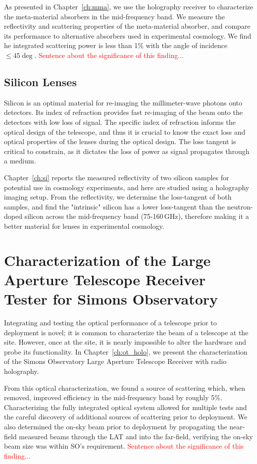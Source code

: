 As presented in Chapter~\ref{ch:mma}, we use the holography receiver to characterize the meta-material absorbers in the mid-frequency band.  We measure the reflectivity and scattering properties of the meta-material absorber, and compare its performance to alternative absorbers used in experimental cosmology.  We find he integrated scattering power is less than 1\% with the angle of incidence  $\leq45\deg$.  \textcolor{red}{Sentence about the significance of this finding...}


\subsection{Silicon Lenses}
Silicon is an optimal material for re-imaging the millimeter-wave photons onto detectors.  Its index of refraction provides fast re-imaging of the beam onto the detectors with low loss of signal.  The specific index of refraction informs the optical design of the telescope, and thus it is crucial to know the exact loss and optical properties of the lenses during the optical design.  The loss tangent is critical to constrain, as it dictates the loss of power as signal propagates through a medium.

Chapter~\ref{ch:si} reports the measured reflectivity of two silicon samples for potential use in cosmology experiments, and here are studied using a holography imaging setup.  From the reflectivity, we determine the loss-tangent of both samples, and find the "intrinsic" silicon has a lower loss-tangent than the neutron-doped silicon across the mid-frequency band (75-160\,GHz), therefore making it a better material for lenses in experimental cosmology.

\section{Characterization of the Large Aperture Telescope Receiver Tester for Simons Observatory}
Integrating and testing the optical performance of a telescope prior to deployment is novel; it is common to characterize the beam of a telescope at the site.  However, once at the site, it is nearly impossible to alter the hardware and probe its functionality.  In Chapter~\ref{ch:ot_holo}, we present the characterization of the Simons Observatory Large Aperture Telescope Receiver with radio holography.

From this optical characterization, we found a source of scattering which, when removed, improved efficiency in the mid-frequency band by roughly 5\%.  Characterizing the fully integrated optical system allowed for multiple tests and the careful discovery of additional sources of scattering prior to deployment.  We also determined the on-sky beam prior to deployment by propagating the near-field measured beams through the LAT and into the far-field, verifying the on-sky beam size was within SO's requirement.  \textcolor{red}{Sentence about the significance of this finding...}

